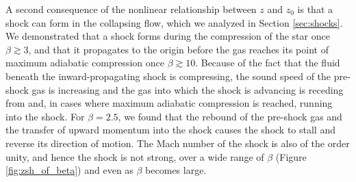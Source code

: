 \documentclass[twocolumn]{aastex62}
\begin{document}
A second consequence of the nonlinear relationship between $z$ and $z_0$ is that a shock can form in the collapsing flow, which we analyzed in Section \ref{sec:shocks}. We demonstrated that a shock forms during the compression of the star once $\beta \gtrsim 3$, and that it propagates to the origin before the gas reaches its point of maximum adiabatic compression once $\beta \gtrsim 10$. Because of the fact that the fluid beneath the inward-propagating shock is compressing, the sound speed of the pre-shock gas is increasing and the gas into which the shock is advancing is receding from and, in cases where maximum adiabatic compression is reached, running into the shock. For $\beta = 2.5$, we found that the rebound of the pre-shock gas and the transfer of upward momentum into the shock causes the shock to stall and reverse its direction of motion. The Mach number of the shock is also of the order unity, and hence the shock is not strong, over a wide range of $\beta$ (Figure \ref{fig:zsh_of_beta}) and even as $\beta$ becomes large.
\end{document}
